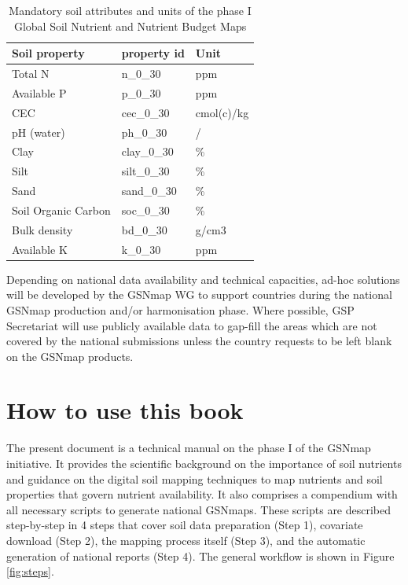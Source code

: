 \documentclass[
  10pt,
  b5paper,
  oneside]{book}
\begin{document}
\begin{table}

\caption{\label{tab:overviewprop}Mandatory soil attributes and units of the phase I Global Soil Nutrient and Nutrient Budget Maps}
\centering
\begin{tabular}[t]{lll}
\toprule
Soil property & property id & Unit\\
\midrule
Total N & n\_0\_30 & ppm\\
Available P & p\_0\_30 & ppm\\
CEC & cec\_0\_30 & cmol(c)/kg\\
pH (water) & ph\_0\_30 & /\\
Clay & clay\_0\_30 & \%\\
\addlinespace
Silt & silt\_0\_30 & \%\\
Sand & sand\_0\_30 & \%\\
Soil Organic Carbon & soc\_0\_30 & \%\\
Bulk density & bd\_0\_30 & g/cm3\\
Available K & k\_0\_30 & ppm\\
\bottomrule
\end{tabular}
\end{table}

Depending on national data availability and technical capacities, ad-hoc solutions will be developed by the GSNmap WG to support countries during the national GSNmap production and/or harmonisation phase. Where possible, GSP Secretariat will use publicly available data to gap-fill the areas which are not covered by the national submissions unless the country requests to be left blank on the GSNmap products.

\hypertarget{how-to-use-this-book}{%
\section{How to use this book}\label{how-to-use-this-book}}

The present document is a technical manual on the phase I of the GSNmap initiative. It provides the scientific background on the importance of soil nutrients and guidance on the digital soil mapping techniques to map nutrients and soil properties that govern nutrient availability. It also comprises a compendium with all necessary scripts to generate national GSNmaps. These scripts are described step-by-step in 4 steps that cover soil data preparation (Step 1), covariate download (Step 2), the mapping process itself (Step 3), and the automatic generation of national reports (Step 4). The general workflow is shown in Figure \ref{fig:steps}.
\end{document}
